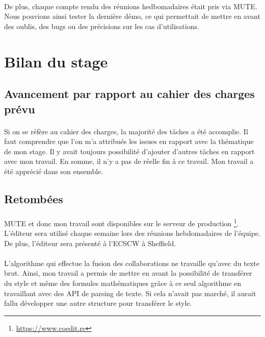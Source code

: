 \documentclass[12pt]{article}
\begin{document}
\paragraph{}
De plus, chaque compte rendu des réunions hedbomadaires était pris via MUTE. Nous pouvions ainsi tester la dernière démo, ce qui permettait de mettre en avant des oublis, des bugs ou des précisions sur les cas d'utilisations.\\

\newpage
\section{Bilan du stage}
\subsection{Avancement par rapport au cahier des charges prévu}
\paragraph{}
Si on se réfère au cahier des charges, la majorité des tâches a été accomplie. Il faut comprendre que l'on m'a attribués les issues en rapport avec la thématique de mon stage. Il y avait toujours possibilité d'ajouter d'autres tâches en rapport avec mon travail. En somme, il n'y a pas de réelle fin à ce travail. Mon travail a été apprécié dans son ensemble.

\subsection{Retombées}
\paragraph{}
MUTE et donc mon travail sont disponibles sur le serveur de production \footnote{\href{https://www.coedit.re}{https://www.coedit.re}}. L'éditeur sera utilisé chaque semaine lors des réunions hebdomadaires de l'équipe. De plus, l'éditeur sera présenté à l'ECSCW à Sheffield.
\paragraph{}
L'algorithme qui effectue la fusion des collaborations ne travaille qu'avec du texte brut. Ainsi, mon travail a permis de mettre en avant la possibilité de transférer du style et même des formules mathématiques grâce à ce seul algorithme en travaillant avec des API de parsing de texte. Si cela n'avait pas marché, il aurait fallu développer une autre structure pour transférer le style.
\end{document}
